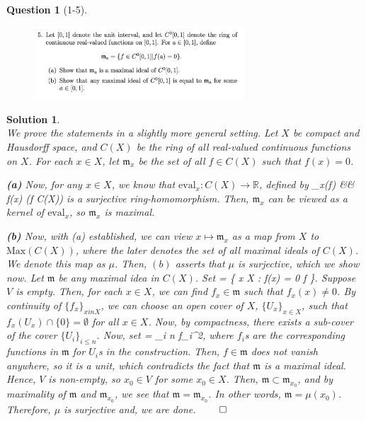 \documentclass[11pt]{article}
\theoremstyle{plain}
\def\eQb#1\eQe{\begin{eqnarray*}#1\end{eqnarray*}}
\theoremstyle{quest}
\newtheorem*{question}{Question}
\newtheorem*{solution}{Solution}
\begin{document}
\newpage

\begin{question}[1-5]
\hfill
\begin{figure}[h!]
  \centering
    \includegraphics[width=0.7\textwidth]{ANT-s1-p5.png}
\end{figure}
\end{question}
\begin{solution} \hfill \\
We prove the statements in a slightly more general setting. Let $X$ be compact 
and Hausdorff space, and $C(X)$ be the ring of all real-valued continuous functions
on $X$. For each $x \in X$, let $\mathfrak{m}_x$ be the set of all $f \in C(X)$ such
that $f(x) = 0$.  

\bigskip

\noindent 
\textbf{(a)} Now, for any $x \in X$, we know that $\text{eval}_x:C(X) \to \mathbb{R}$,
defined by 
\eQb
\text{eval}_x(f) &\mapsto& f(x) \>\>\>\>\> (f \in C(X))
\eQe
is a surjective ring-homomorphism. Then, $\mathfrak{m}_x$ can be viewed as a kernel
of $\text{eval}_x$, so $\mathfrak{m}_x$ is maximal.  

\bigskip

\noindent
\textbf{(b)} Now, with (a) established, we can view $x \mapsto \mathfrak{m}_x$ 
as a map from $X$ to $\text{Max}(C(X))$, where the later denotes the set of
all maximal ideals of $C(X)$. We denote this map as $\mu$. Then, $(b)$ asserts
that $\mu$ is surjective, which we show now. Let $\mathfrak{m}$ be any
maximal idea in $C(X)$. Set
\eQb
V = \{ x \in X \> : \> f(x) = 0 \>\>\>  \>\>\> f \in {} \}.
\eQe 
Suppose $V$ is empty. Then, for each $x \in X$, we can find $f_x \in \mathfrak{m}$
such that $f_x(x) \neq 0$. By continuity of $\{f_x\}_{x in X}$, we can choose
an open cover of $X$,
$\{U_x\}_{x \in X}$, such that $f_x(U_x) \cap \{ 0\} = \emptyset$ for all $x \in X$.
Now, by compactness, there exists a sub-cover of the cover $\{U_i\}_{i \leq n}$.
Now, set 
\eQb
f = \sum_{i \leq n} f_i^2,
\eQe
where $f_i$s are the corresponding functions in $\mathfrak{m}$ for $U_i$s in
the construction. Then, $f \in \mathfrak{m}$ 
does not vanish anywhere, so it is a unit, which contradicts
the fact that $\mathfrak{m}$ is a maximal ideal. Hence, $V$ is non-empty, so $x_0 \in
V$ for some $x_0 \in X$. Then, $\mathfrak{m} \subset \mathfrak{m}_{x_0}$, and by 
maximality of $\mathfrak{m}$ and $\mathfrak{m}_{x_0}$, 
we see that $\mathfrak{m} = \mathfrak{m}_{x_0}$. In other words, $\mathfrak{m} = 
\mu(x_0)$. Therefore, $\mu$ is surjective and, we are done. \hfill $\qed$
 
 

\end{solution}
\end{document}
